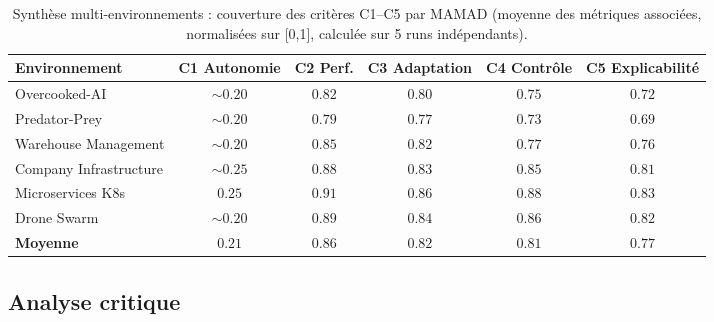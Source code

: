 \begin{table}[h!]
  \centering
  \caption{Synthèse multi-environnements : couverture des critères C1--C5 par MAMAD (moyenne des métriques associées, normalisées sur [0,1], calculée sur 5 runs indépendants).}
  \label{tab:criteria_summary}
  \renewcommand{\arraystretch}{1.4}
  \scriptsize
  \begin{tabular}{lccccc}
    \hline
    \textbf{Environnement} & \textbf{C1 Autonomie} & \textbf{C2 Perf.} & \textbf{C3 Adaptation} & \textbf{C4 Contrôle} & \textbf{C5 Explicabilité} \\
    \hline
    Overcooked-AI          & $\sim0.20$            & $0.82$            & $0.80$                 & $0.75$               & $0.72$                    \\
    Predator-Prey          & $\sim0.20$            & $0.79$            & $0.77$                 & $0.73$               & $0.69$                    \\
    Warehouse Management   & $\sim0.20$            & $0.85$            & $0.82$                 & $0.77$               & $0.76$                    \\
    Company Infrastructure & $\sim0.25$            & $0.88$            & $0.83$                 & $0.85$               & $0.81$                    \\
    Microservices K8s      & $0.25$                & $0.91$            & $0.86$                 & $0.88$               & $0.83$                    \\
    Drone Swarm            & $\sim0.20$            & $0.89$            & $0.84$                 & $0.86$               & $0.82$                    \\
    \hdashline
    \textbf{Moyenne}       & $0.21$                & $0.86$            & $0.82$                 & $0.81$               & $0.77$                    \\
    \hline
  \end{tabular}
\end{table}

\subsection{Analyse critique}

